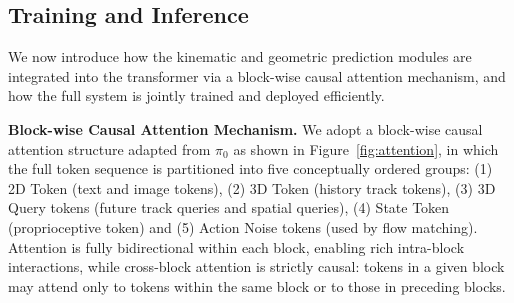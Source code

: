 \subsection{Training and Inference} \label{sec:train_infer}

We now introduce how the kinematic and geometric prediction modules are integrated into the transformer via a block-wise causal attention mechanism, and how the full system is jointly trained and deployed efficiently.

\noindent
\textbf{Block-wise Causal Attention Mechanism.}
%
%
We adopt a block-wise causal attention structure adapted from $\pi_0$ as shown in Figure~\ref{fig:attention}, in which the full token sequence is partitioned into five conceptually ordered groups: (1) 2D Token (text and image tokens), (2) 3D Token (history track tokens), (3) 3D Query tokens (future track queries and spatial queries), (4) State Token (proprioceptive token) and (5) Action Noise tokens (used by flow matching). Attention is fully bidirectional within each block, enabling rich intra-block interactions, while cross-block attention is strictly causal: tokens in a given block may attend only to tokens within the same block or to those in preceding blocks.


